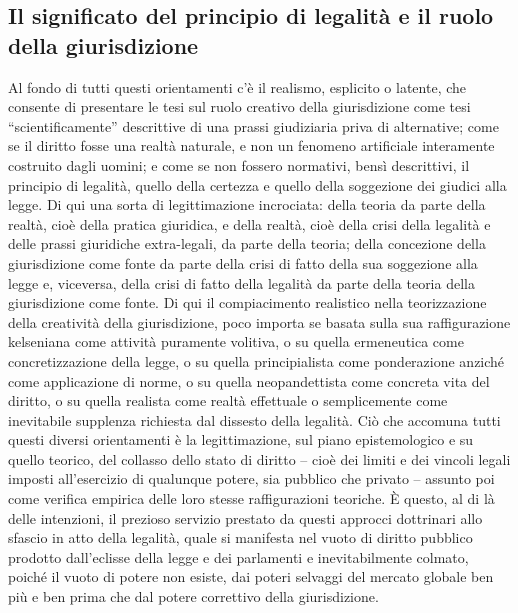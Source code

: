 \subsection{Il significato del principio di legalità e il ruolo della giurisdizione} %
Al fondo di tutti questi orientamenti c’è il realismo, esplicito o latente, che consente di presentare le tesi sul ruolo creativo della giurisdizione come tesi “scientificamente” descrittive di una prassi giudiziaria priva di alternative; come se il diritto fosse una realtà naturale, e non un fenomeno artificiale interamente costruito dagli uomini; e come se non fossero normativi, bensì descrittivi, il principio di legalità, quello della certezza e quello della soggezione dei giudici alla legge. Di qui una sorta di legittimazione incrociata: della teoria da parte della realtà, cioè della pratica giuridica, e della realtà, cioè della crisi della legalità e delle prassi giuridiche extra-legali, da parte della teoria; della concezione della giurisdizione come fonte da parte della crisi di fatto della sua soggezione alla legge e, viceversa, della crisi di fatto della legalità da parte della teoria della giurisdizione come fonte. Di qui il compiacimento realistico nella teorizzazione della creatività della giurisdizione, poco importa se basata sulla sua raffigurazione kelseniana come attività puramente volitiva, o su quella ermeneutica come concretizzazione della legge, o su quella principialista come ponderazione anziché come applicazione di norme, o su quella neopandettista come concreta vita del diritto, o su quella realista come realtà effettuale o semplicemente come inevitabile supplenza richiesta dal dissesto della legalità. Ciò che accomuna tutti questi diversi orientamenti è la legittimazione, sul piano epistemologico e su quello teorico, del collasso dello stato di diritto – cioè dei limiti e dei vincoli legali imposti all’esercizio di qualunque potere, sia pubblico che privato – assunto poi come verifica empirica delle loro stesse raffigurazioni teoriche. È questo, al di là delle intenzioni, il prezioso servizio prestato da questi approcci dottrinari allo sfascio in atto della legalità, quale si manifesta nel vuoto di diritto pubblico prodotto dall’eclisse della legge e dei parlamenti e inevitabilmente colmato, poiché il vuoto di potere non esiste, dai poteri selvaggi del mercato globale ben più e ben prima che dal potere correttivo della giurisdizione.
